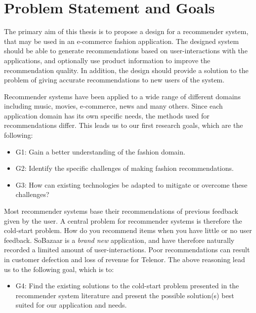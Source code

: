 
\section{Problem Statement and Goals}

The primary aim of this thesis is to propose a design for a recommender system, that may be used in an
e-commerce fashion application. The designed system should be able to generate recommendations based on
user-interactions with the applications, and optionally use product information to improve the recommendation
quality. In addition, the design should provide a solution to the problem of giving accurate recommendations
to new users of the system.

Recommender systems have been applied to a wide range of different domains including music, movies, e-commerce, news
and many others. Since each application domain has its own specific needs, the methods used for recommendations differ.
This leads us to our first research goals, which are the following:

\begin{itemize}
	\item G1: Gain a better understanding of the fashion domain.
  	\item G2: Identify the specific challenges of making fashion recommendations.
  	\item G3: How can existing technologies be adapted to mitigate or overcome these challenges?
\end{itemize}

Most recommender systems base their recommendations of previous feedback given by the user. A central problem for
recommender systems is therefore the cold-start problem. How do you recommend items when you have little or no
user feedback. SoBazaar is a \emph{brand new} application, and have therefore naturally recorded a limited amount
of user-interactions. Poor recommendations can result in customer defection and loss of revenue for Telenor.
The above reasoning lead us to the following goal, which is to:

\begin{itemize}
  \item G4: Find the existing solutions to the cold-start problem presented in the recommender system literature
  		and present the possible solution(s) best suited for our application and needs.
\end{itemize}

